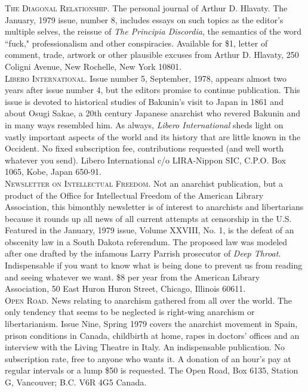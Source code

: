 \noindent \textsc{The Diagonal Relationship.} The personal journal of Arthur D. Hlavaty. The January, 1979 issue, number 8, includes essays on such topics as the editor's multiple selves, the reissue of \emph{The Principia Discordia}, the semantics of the word ``fuck," professionalism and other conspiracies. Available for \$1, letter of comment, trade, artwork or other plausible excuses from Arthur D. Hlavaty, 250 Coligni Avenue, New Rochelle, New York 10801.\\

\noindent \textsc{Libero International.} Issue number 5, September, 1978, appears almost two years after issue number 4, but the editors promise to continue publication. This issue is devoted to historical studies of Bakunin's visit to Japan in 1861 and about Osugi Sakae, a 20th century Japanese anarchist who revered Bakunin and in many ways resembled him. As always, \emph{Libero International} sheds light on vastly important aspects of the world and its history that are little known in the Occident. No fixed subscription fee, contributions requested (and well worth whatever you send). Libero International c/o LIRA-Nippon SIC, C.P.O. Box 1065, Kobe, Japan 650-91.\\

\noindent \textsc{Newsletter on Intellectual Freedom.} Not an anarchist publication, but a product of the Office for Intellectual Freedom of the American Library Association, this bimonthly newsletter is of interest to anarchists and libertarians because it rounds up all news of all current attempts at censorship in the U.S. Featured in the January, 1979 issue, Volume XXVIII, No. 1, is the defeat of an obscenity law in a South Dakota referendum. The proposed law was modeled after one drafted by the infamous Larry Parrish prosecutor of \emph{Deep Throat}. Indispensable if you want to know what is being done to prevent us from reading and seeing whatever we want. \$8 per year from the American Library Association, 50 East Huron Huron Street, Chicago, Illinois 60611.\\
                                                                                      
\noindent \textsc{Open Road.} News relating to anarchism gathered from all over the world. The only tendency that seems to be neglected is right-wing anarchism or libertarianism. Issue Nine, Spring 1979 covers the anarchist movement in Spain, prison conditions in Canada, childbirth at home, rapes in doctors' offices and an interview with the Living Theatre in Italy. An indispensable publication. No subscription rate, free to anyone who wants it. A donation of an hour's pay at regular intervals or a lump \$50 is requested. The Open Road, Box 6135, Station G, Vancouver; B.C. V6R 4G5 Canada.\\

